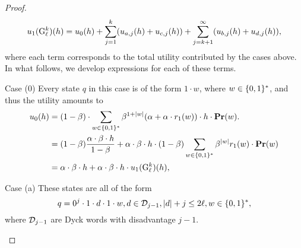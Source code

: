 \begin{proof}
$$u_1({\rm {G}}^k_\ell)(h) = u_0(h) + \sum_{j=1}^k (u_{a,j}(h) + u_{c,j}(h)) + \sum_{j=k+1}^\infty (u_{b,j}(h) + u_{d,j}(h)),$$
where each term corresponds to the total utility contributed by the cases above. In what follows, we develop expressions for each of these terms.

\begin{subsubsection}{Case (0)} Every state $q$ in this case is of the form $1\cdot w$, where $w\in \{0,1\}^\ast$, and thus the utility amounts to
\begin{align*}
u_0(h) &= (1-\beta) \cdot \sum_{w\in \{0,1\}^\ast}\beta^{1+|w|} (\alpha + \alpha\cdot r_1(w))\cdot h \cdot \mathbf{Pr}(w).\\
    &= (1-\beta) \frac{\alpha\cdot \beta \cdot h}{1-\beta} + \alpha\cdot\beta\cdot h \cdot(1-\beta) \sum_{w\in \{0,1\}^\ast}\beta^{|w|} r_1(w) \cdot \mathbf{Pr}(w)\\
    &= \alpha\cdot \beta \cdot h + \alpha\cdot\beta\cdot h\cdot u_1({\rm {G}}^k_\ell)(h),
\end{align*}
\end{subsubsection}


\begin{subsubsection}{Case (a)}
These states are all of the form 
$$q = 0^j\cdot 1\cdot d\cdot 1\cdot w, d\in \mathcal{D}_{j-1}, |d|+j \leq 2\ell, w\in \{0,1\}^\ast,$$ 
where $\mathcal{D}_{j-1}$ are Dyck words with disadvantage $j-1$. 

\begin{figure}[ht!]
\end{figure}
\end{subsubsection}
\end{proof}
